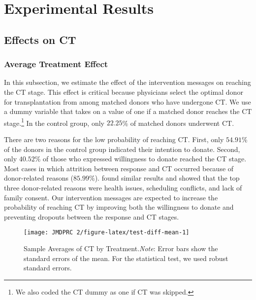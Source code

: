 \documentclass[12pt, a4paper]{article}
\begin{document}
\hypertarget{result}{%
\section{Experimental Results}\label{result}}

\hypertarget{main}{%
\subsection{Effects on CT}\label{main}}

\hypertarget{average-treatment-effect}{%
\subsubsection{Average Treatment Effect}\label{average-treatment-effect}}

In this subsection, we estimate the effect of the intervention messages on reaching the CT stage. This effect is critical because physicians select the optimal donor for transplantation from among matched donors who have undergone CT. We use a dummy variable that takes on a value of one if a matched donor reaches the CT stage.\footnote{We also coded the CT dummy as one if CT was skipped.} In the control group, only \(22.25\)\% of matched donors underwent CT.

There are two reasons for the low probability of reaching CT. First, only \(54.91\)\% of the donors in the control group indicated their intention to donate. Second, only \(40.52\)\% of those who expressed willingness to donate reached the CT stage. Most cases in which attrition between response and CT occurred because of donor-related reasons (\(85.99\)\%). \citet{Hirakawa2018} found similar results and showed that the top three donor-related reasons were health issues, scheduling conflicts, and lack of family consent. Our intervention messages are expected to increase the probability of reaching CT by improving both the willingness to donate and preventing dropouts between the response and CT stages.

\begin{figure}[t]
\texttt{[image: JMDPRC~2/figure-latex/test-diff-mean-1]} \caption{Sample Averages of CT by Treatment.\newline \emph{Note}: Error bars show the standard errors of the mean. For the statistical test, we used robust standard errors.}\label{fig:test-diff-mean}
\end{figure}
\end{document}
